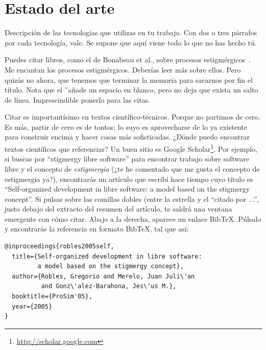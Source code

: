 
\cleardoublepage
\chapter{Estado del arte}
\label{chap:estado}

Descripción de las tecnologías que utilizas en tu trabajo. 
Con dos o tres párrafos por cada tecnología, vale. 
Se supone que aquí viene todo lo que no has hecho tú.

Puedes citar libros, como el de Bonabeau et al., sobre procesos estigmérgicos~\cite{bonabeau:_swarm}. 
Me encantan los procesos estigmérgicos.
Deberías leer más sobre ellos.
Pero quizás no ahora, que tenemos que terminar la memoria para sacarnos por fin el título.
Nota que el \~ \ añade un espacio en blanco, pero no deja que exista un salto de línea. 
Imprescindible ponerlo para las citas.

Citar es importantísimo en textos científico-técnicos. 
Porque no partimos de cero.
Es más, partir de cero es de tontos; lo suyo es aprovecharse de lo ya existente para construir encima y hacer cosas más sofisticadas.
¿Dónde puedo encontrar textos científicos que referenciar?
Un buen sitio es Google Scholar\footnote{\url{http://scholar.google.com}}.
Por ejemplo, si buscas por ``stigmergy libre software'' para encontrar trabajo sobre software libre y el concepto de \emph{estigmergia} (¿te he comentado que me gusta el concepto de estigmergia ya?), encontrarás un artículo que escribí hace tiempo cuyo título es ``Self-organized development in libre software: a model based on the stigmergy concept''.
Si pulsas sobre las comillas dobles (entre la estrella y el ``citado por ...'', justo debajo del extracto del resumen del artículo, te saldrá una ventana emergente con cómo citar.
Abajo a la derecha, aparece un enlace BibTeX.
Púlsalo y encontrarás la referencia en formato BibTeX, tal que así:

{\footnotesize
\begin{verbatim}
@inproceedings{robles2005self,
  title={Self-organized development in libre software:
         a model based on the stigmergy concept},
  author={Robles, Gregorio and Merelo, Juan Juli\'an 
          and Gonz\'alez-Barahona, Jes\'us M.},
  booktitle={ProSim'05},
  year={2005}
}
\end{verbatim}
}

